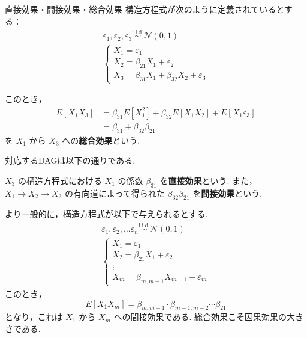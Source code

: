 \documentclass[uplatex, dvipdfmx]{jsarticle}
\begin{document}
\begin{exm}{直接効果・間接効果・総合効果}
  構造方程式が次のように定義されているとする：
  \begin{align}
    \varepsilon_1, \varepsilon_2, \varepsilon_3 \overset{\text{i.i.d.}}{\sim} \mathcal{N}(0, 1) \\
    \begin{cases}
    X_1 = \varepsilon_1 \\
    X_2 = \beta_{21} X_1 + \varepsilon_2 \\
    X_3 = \beta_{31} X_1 + \beta_{32} X_2 + \varepsilon_3
    \end{cases}
  \end{align}

  このとき，
  \begin{align}
    E[X_1 X_3] &= \beta_{31} E[X_1^2] + \beta_{32} E[X_1 X_2] + E[X_1 \varepsilon_3] \\
    &= \beta_{31} + \beta_{32} \beta_{21}
  \end{align}
  を $X_1$ から $X_3$ への\textbf{総合効果}という.

  対応するDAGは以下の通りである.
  \begin{center}
  \end{center}

  $X_3$ の構造方程式における $X_1$ の係数 $\beta_{31}$ を\textbf{直接効果}という.
  また，$X_1 \to X_2 \to X_3$ の有向道によって得られた $\beta_{32} \beta_{21}$ を\textbf{間接効果}という.

  より一般的に，構造方程式が以下で与えられるとする.
  \begin{align}
    \varepsilon_1, \varepsilon_2, \dots \varepsilon_n \overset{\text{i.i.d.}}{\sim} \mathcal{N}(0, 1) \\
    \begin{cases}
    X_1 = \varepsilon_1 \\
    X_2 = \beta_{21} X_1 + \varepsilon_2 \\
    \vdots \\
    X_m = \beta_{m, m-1} X_{m-1} + \varepsilon_m
    \end{cases}
  \end{align}
  このとき，
  \begin{equation}
    E[X_1 X_m] = \beta_{m, m-1} \cdot \beta_{m-1, m-2} \cdots \beta_{21}
  \end{equation}
  となり，これは $X_1$ から $X_m$ への間接効果である.
  総合効果こそ因果効果の大きさである.
\end{exm}
\end{document}
